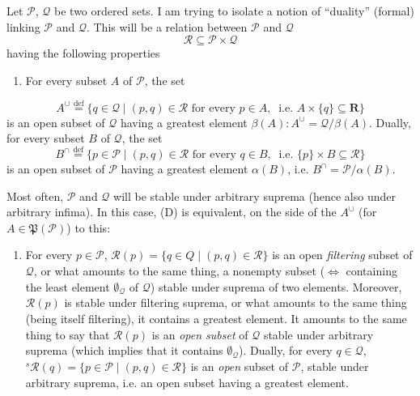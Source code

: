 \documentclass[11pt]{article}
\newcommand{\msp}[1]{\marginpar{\footnotesize [#1]}}
\begin{document}
Let $\mathcal{P}$, $\mathcal{Q}$ be two ordered sets. I am trying to isolate a notion of ``duality'' (formal) linking $\mathcal{P}$ and $\mathcal{Q}$. This will be a relation between $\mathcal{P}$ and $\mathcal{Q}$
\[
\mathcal{R} \subseteq \mathcal{P} \times \mathcal{Q}
\tag*{(5.1)}
\]
having the following properties
\begin{enumerate}[leftmargin=*, labelindent=0.5em]
\item[(D)] For every subset $A$ of $\mathcal{P}$, the set
\end{enumerate}
\[
A^\cup \overset{\text{def}}{=} \{ q \in \mathcal{Q} \mid (p,q) \in \mathcal{R} \text{ for every } p \in A,\ \text{ i.e. } A \times \{q\} \subseteq \mathbf{R} \} %
\]
is an open subset of $\mathcal{Q}$ having a greatest element $\beta(A) : A^\cup = \mathcal{Q}/\beta(A)$. Dually, for every subset $B$ of $\mathcal{Q}$, the set
\[
B^\cap \overset{\text{def}}{=} \{ p \in \mathcal{P} \mid (p,q) \in \mathcal{R} \text{ for every } q \in B,\ \text{ i.e. } \{p\} \times B \subseteq \mathcal{R} \}
\]
is an open subset of $\mathcal{P}$ having a greatest element $\alpha(B)$, i.e. $B^\cap = \mathcal{P}/\alpha(B)$.

Most often, $\mathcal{P}$ and $\mathcal{Q}$ will be stable under arbitrary suprema (hence also under arbitrary infima). In this case, (D) is equivalent, on the side of the $A^\cup$ (for $A \in \mathfrak{P}(\mathcal{P})$) to this:
\begin{enumerate}[leftmargin=*, labelindent=0em]
\item[(D$_0$)] For every $p \in \mathcal{P}$, $\mathcal{R}(p) = \{ q \in Q \mid (p,q) \in \mathcal{R} \}$ is an open \textit{filtering} subset of $\mathcal{Q}$, or what amounts to the same thing, a nonempty subset ($\Longleftrightarrow$ containing the least element $\emptyset_{\mathcal{Q}}$ of $\mathcal{Q}$) stable under suprema of two elements. Moreover, $\mathcal{R}(p)$ is stable under filtering suprema, or what amounts to the same thing (being itself filtering), it contains a greatest element. It amounts %
\msp{page 70}
to the same thing to say that $\mathcal{R}(p)$ is an \textit{open subset} of $\mathcal{Q}$ stable under arbitrary suprema (which implies that it contains $\emptyset_{\mathcal{Q}}$). Dually, for every $q \in \mathcal{Q}$, ${}^{s}\mathcal{R}(q) = \{ p \in \mathcal{P} \mid (p,q) \in \mathcal{R} \}$ is an \textit{open} subset of $\mathcal{P}$, stable under arbitrary suprema, i.e. an open subset having a greatest element. %
\end{enumerate}
\end{document}
